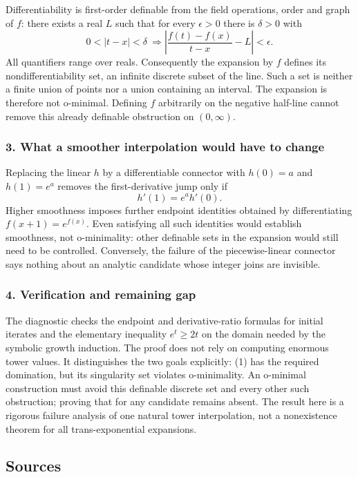 \documentclass[11pt,a4paper]{article}
\begin{document}
Differentiability is first-order definable from the field operations, order and graph of $f$: there exists a real $L$ such that for every $\epsilon>0$ there is $\delta>0$ with
\[0<|t-x|<\delta\ \Longrightarrow
\left|\frac{f(t)-f(x)}{t-x}-L\right|<\epsilon.
\]
All quantifiers range over reals. Consequently the expansion by $f$ defines its nondifferentiability set, an infinite discrete subset of the line. Such a set is neither a finite union of points nor a union containing an interval. The expansion is therefore not o-minimal. Defining $f$ arbitrarily on the negative half-line cannot remove this already definable obstruction on $(0,\infty)$.

\subsubsection{3. What a smoother interpolation would have to change}
Replacing the linear $h$ by a differentiable connector with $h(0)=a$ and $h(1)=e^a$ removes the first-derivative jump only if
\[h'(1)=e^a h'(0).
\]
Higher smoothness imposes further endpoint identities obtained by differentiating $f(x+1)=e^{f(x)}$. Even satisfying all such identities would establish smoothness, not o-minimality: other definable sets in the expansion would still need to be controlled. Conversely, the failure of the piecewise-linear connector says nothing about an analytic candidate whose integer joins are invisible.

\subsubsection{4. Verification and remaining gap}
The diagnostic checks the endpoint and derivative-ratio formulas for initial iterates and the elementary inequality $e^t\geq2t$ on the domain needed by the symbolic growth induction. The proof does not rely on computing enormous tower values. It distinguishes the two goals explicitly: (1) has the required domination, but its singularity set violates o-minimality. An o-minimal construction must avoid this definable discrete set and every other such obstruction; proving that for any candidate remains absent. The result here is a rigorous failure analysis of one natural tower interpolation, not a nonexistence theorem for all trans-exponential expansions.

\subsection{Sources}
\end{document}
